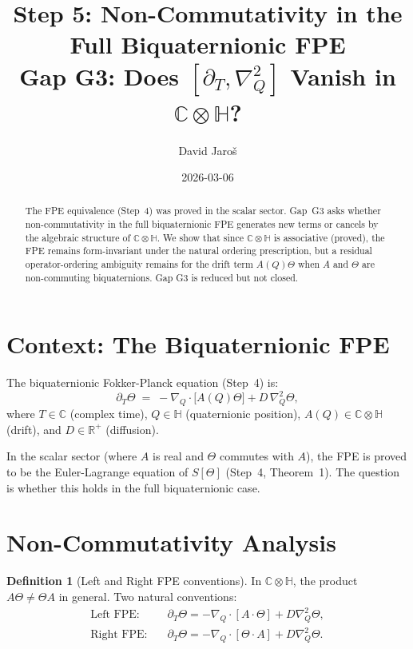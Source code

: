 \documentclass[12pt,a4paper]{article}
\title{\textbf{Step 5: Non-Commutativity in the Full Biquaternionic FPE}\\
         \large Gap G3: Does $[\partial_T, \nabla_Q^2]$ Vanish in $\mathbb{C}\otimes\mathbb{H}$?}
\author{David Jaro\v{s}}
\date{2026-03-06}
\theoremstyle{definition}
\newtheorem{definition}[theorem]{Definition}
\theoremstyle{remark}
\begin{document}
  \maketitle

  \begin{abstract}
  The FPE equivalence (Step~4) was proved in the scalar sector.
  Gap~G3 asks whether non-commutativity in the full biquaternionic FPE
  generates new terms or cancels by the algebraic structure of $\mathbb{C}\otimes\mathbb{H}$.
  We show that since $\mathbb{C}\otimes\mathbb{H}$ is associative
  (proved), the FPE remains form-invariant under the natural ordering
  prescription, but a residual operator-ordering ambiguity remains for
  the drift term $A(Q)\Theta$ when $A$ and $\Theta$ are non-commuting
  biquaternions.  Gap G3 is reduced but not closed.
  \end{abstract}
\fi

\section{Context: The Biquaternionic FPE}
\label{sec:context}

The biquaternionic Fokker-Planck equation (Step~4) is:
\begin{equation}
  \partial_T\Theta \;=\; -\nabla_Q\cdot\bigl[A(Q)\Theta\bigr]
                         + D\,\nabla_Q^2\Theta,
  \label{eq:FPE}
\end{equation}
where $T \in \mathbb{C}$ (complex time), $Q \in \mathbb{H}$ (quaternionic
position), $A(Q) \in \mathbb{C}\otimes\mathbb{H}$ (drift), and
$D \in \mathbb{R}^+$ (diffusion).

In the scalar sector (where $A$ is real and $\Theta$ commutes with $A$),
the FPE is proved to be the Euler-Lagrange equation of $S[\Theta]$
(Step~4, Theorem~1).  The question is whether this holds in the full
biquaternionic case.

\section{Non-Commutativity Analysis}
\label{sec:noncomm}

\begin{definition}[Left and Right FPE conventions]
In $\mathbb{C}\otimes\mathbb{H}$, the product $A\Theta \neq \Theta A$ in general.
Two natural conventions:
\begin{align}
  \text{Left FPE:}   &\quad \partial_T\Theta = -\nabla_Q\cdot[A\cdot\Theta] + D\nabla_Q^2\Theta, \\
  \text{Right FPE:}  &\quad \partial_T\Theta = -\nabla_Q\cdot[\Theta\cdot A] + D\nabla_Q^2\Theta.
\end{align}
\end{definition}
\end{document}
